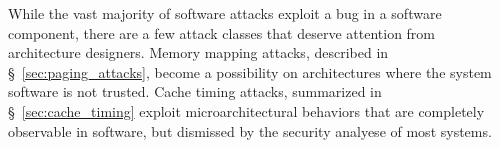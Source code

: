 While the vast majority of software attacks exploit a bug in a software
component, there are a few attack classes that deserve attention from
architecture designers. Memory mapping attacks, described in
\S~\ref{sec:paging_attacks}, become a possibility on architectures where the
system software is not trusted. Cache timing attacks, summarized in
\S~\ref{sec:cache_timing} exploit microarchitectural behaviors that are
completely observable in software, but dismissed by the security analyese of
most systems.









